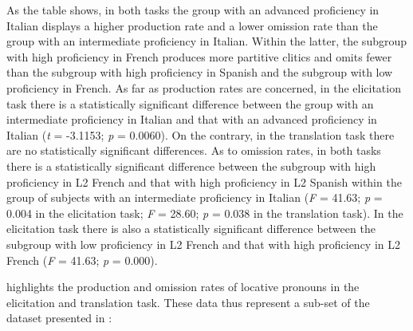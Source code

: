 \documentclass[output=paper,modfonts,nonflat,newtxmath]{langsci/langscibook}
\begin{document}
As the table shows, in both tasks the group with an advanced proficiency in Italian displays a higher production rate and a lower omission rate than the group with an intermediate proficiency in Italian. Within the latter, the subgroup with high proficiency in French produces more partitive clitics and omits fewer than the subgroup with high proficiency in Spanish and the subgroup with low proficiency in French. As far as production rates are concerned, in the elicitation task there is a statistically significant difference between the group with an intermediate proficiency in Italian and that with an advanced proficiency in Italian (\textit{t} = -3.1153; \textit{p} = 0.0060). On the contrary, in the translation task there are no statistically significant differences. As to omission rates, in both tasks there is a statistically significant difference between the subgroup with high proficiency in L2 French and that with high proficiency in L2 Spanish within the group of subjects with an intermediate proficiency in Italian (\textit{F} = 41.63; \textit{p} = 0.004 in the elicitation task; \textit{F} = 28.60; \textit{p} = 0.038 in the translation task). In the elicitation task there is also a statistically significant difference between the subgroup with low proficiency in L2 French and that with high proficiency in L2 French (\textit{F} = 41.63; \textit{p} = 0.000).



 highlights the production and omission rates of locative pronouns in the elicitation and translation task. These data thus represent a sub-set of the dataset presented in :
\end{document}
